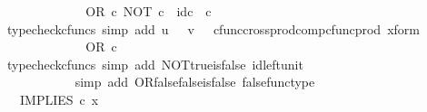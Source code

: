 \begin{isabellebody}
\ \ \ \ \ \ \ \ \isamarkupfalse%
\ \isamarkupfalse%
\ {\isachardoublequoteopen}{\isachardot}{\kern0pt}{\isachardot}{\kern0pt}{\isachardot}{\kern0pt}\ {\isacharequal}{\kern0pt}\ OR\ {\isasymcirc}\isactrlsub c\ {\isasymlangle}NOT\ {\isasymcirc}\isactrlsub c\ {\isasymt}{\isacharcomma}{\kern0pt}\ id\isactrlsub c\ {\isasymOmega}\ {\isasymcirc}\isactrlsub c\ {\isasymf}{\isasymrangle}{\isachardoublequoteclose}\isanewline
\ \ \ \ \ \ \ \ \ \ \isamarkupfalse%
\ {\isacharparenleft}{\kern0pt}typecheck{\isacharunderscore}{\kern0pt}cfuncs{\isacharcomma}{\kern0pt}\ simp\ add{\isacharcolon}{\kern0pt}\ {\isacartoucheopen}u\ {\isacharequal}{\kern0pt}\ {\isasymt}{\isacartoucheclose}\ {\isacartoucheopen}v\ {\isacharequal}{\kern0pt}\ {\isasymf}{\isacartoucheclose}\ cfunc{\isacharunderscore}{\kern0pt}cross{\isacharunderscore}{\kern0pt}prod{\isacharunderscore}{\kern0pt}comp{\isacharunderscore}{\kern0pt}cfunc{\isacharunderscore}{\kern0pt}prod\ x{\isacharunderscore}{\kern0pt}form{\isacharparenright}{\kern0pt}\isanewline
\ \ \ \ \ \ \ \ \isamarkupfalse%
\ \isamarkupfalse%
\ {\isachardoublequoteopen}{\isachardot}{\kern0pt}{\isachardot}{\kern0pt}{\isachardot}{\kern0pt}\ {\isacharequal}{\kern0pt}\ OR\ {\isasymcirc}\isactrlsub c\ {\isasymlangle}{\isasymf}{\isacharcomma}{\kern0pt}\ {\isasymf}{\isasymrangle}{\isachardoublequoteclose}\isanewline
\ \ \ \ \ \ \ \ \ \ \isamarkupfalse%
\ {\isacharparenleft}{\kern0pt}typecheck{\isacharunderscore}{\kern0pt}cfuncs{\isacharcomma}{\kern0pt}\ simp\ add{\isacharcolon}{\kern0pt}\ NOT{\isacharunderscore}{\kern0pt}true{\isacharunderscore}{\kern0pt}is{\isacharunderscore}{\kern0pt}false\ id{\isacharunderscore}{\kern0pt}left{\isacharunderscore}{\kern0pt}unit{}{\isacharparenright}{\kern0pt}\isanewline
\ \ \ \ \ \ \ \ \isamarkupfalse%
\ \isamarkupfalse%
\ {\isachardoublequoteopen}{\isachardot}{\kern0pt}{\isachardot}{\kern0pt}{\isachardot}{\kern0pt}\ {\isacharequal}{\kern0pt}\ {\isasymf}{\isachardoublequoteclose}\isanewline
\ \ \ \ \ \ \ \ \ \ \isamarkupfalse%
\ {\isacharparenleft}{\kern0pt}simp\ add{\isacharcolon}{\kern0pt}\ OR{\isacharunderscore}{\kern0pt}false{\isacharunderscore}{\kern0pt}false{\isacharunderscore}{\kern0pt}is{\isacharunderscore}{\kern0pt}false\ false{\isacharunderscore}{\kern0pt}func{\isacharunderscore}{\kern0pt}type{\isacharparenright}{\kern0pt}\isanewline
\ \ \ \ \ \ \ \ \isamarkupfalse%
\ \isamarkupfalse%
\ {\isachardoublequoteopen}{\isachardot}{\kern0pt}{\isachardot}{\kern0pt}{\isachardot}{\kern0pt}\ {\isacharequal}{\kern0pt}\ IMPLIES\ {\isasymcirc}\isactrlsub c\ x{\isachardoublequoteclose}\isanewline

\end{isabellebody}
